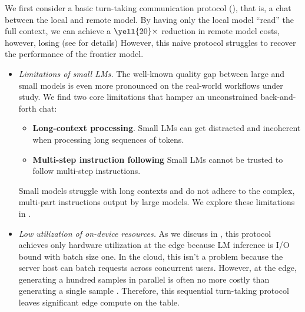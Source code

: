 We first consider a basic turn-taking communication protocol (\naive), that is, a chat between the local and remote model. By having only the local model ``read'' the full context, we can achieve a $\yell{20}\times$ reduction in remote model costs, however, losing    (see  for details)
However, this naïve protocol struggles to recover the performance of the frontier model. 



\begin{itemize}
    \item  \emph{Limitations of small LMs.} The well-known quality gap between large and small models \cite{kaplan2020scaling} is even more pronounced on the real-world workflows under study. We find two core limitations that hamper an unconstrained back-and-forth chat:
    \begin{itemize}
        \item \textbf{Long-context processing}. Small LMs can get distracted and incoherent when processing long sequences of tokens.
        \item \textbf{Multi-step instruction following} Small LMs cannot be trusted to follow multi-step instructions.
    \end{itemize}
    
    Small models struggle with long contexts and do not adhere to the complex, multi-part instructions output by large models. We explore these limitations in .
    \item \emph{Low utilization of on-device resources.} As we discuss in , this protocol achieves only  hardware utilization at the edge because LM inference is I/O bound with batch size one. In the cloud, this isn't a problem because the server host can batch requests across concurrent users. However, at the edge, generating a hundred samples in parallel is often no more costly than generating a single sample \cite{leviathan2023fast}.  Therefore, this sequential turn-taking protocol leaves significant edge compute on the table.
\end{itemize}

